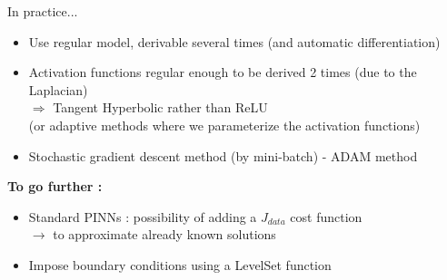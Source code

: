 \begin{frame}{In practice...}
	\begin{itemize}[]		
		\item Use regular model, derivable several times (and automatic differentiation)
		
		\item Activation functions regular enough to be derived 2 times (due to the Laplacian) \\
		$\Rightarrow$ Tangent Hyperbolic rather than ReLU \\
		(or adaptive methods where we parameterize the activation functions)
		
		\begin{center}
			\begin{minipage}{0.43\linewidth}
				\raggedleft
			\end{minipage} \hfill
			\begin{minipage}{0.1\linewidth}
				\centering
			\end{minipage} \hfill
			\begin{minipage}{0.43\linewidth}
				\raggedright
			\end{minipage}
		\end{center}
	
		\item Stochastic gradient descent method (by mini-batch) - ADAM method 		
	\end{itemize}

	\textbf{To go further :}
	\begin{itemize}[]				
		\item Standard PINNs : possibility of adding a $J_{data}$ cost function \\
		$\rightarrow$ to approximate already known solutions
		
		\item Impose boundary conditions using a LevelSet function
	\end{itemize}

	
\end{frame}

